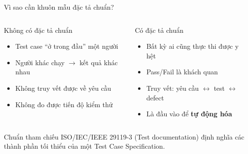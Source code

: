 \documentclass[aspectratio=169,12pt]{beamer}
\begin{document}
\begin{frame}{Vì sao cần khuôn mẫu đặc tả chuẩn?}
  \begin{columns}[T]
    \begin{block}{Không có đặc tả chuẩn}
      \begin{itemize}
        \item Test case ``ở trong đầu'' một người
        \item Người khác chạy $\to$ kết quả khác nhau
        \item Không truy vết được về yêu cầu
        \item Không đo được tiến độ kiểm thử
      \end{itemize}
    \end{block}

    \begin{block}{Có đặc tả chuẩn}
      \begin{itemize}
        \item Bất kỳ ai cũng thực thi được y hệt
        \item Pass/Fail là khách quan
        \item Truy vết: yêu cầu $\leftrightarrow$ test $\leftrightarrow$ defect
        \item Là đầu vào để \textbf{tự động hóa}
      \end{itemize}
    \end{block}
  \end{columns}

  \vspace{0.3em}
  \begin{exampleblock}{Chuẩn tham chiếu}
    ISO/IEC/IEEE 29119-3 (Test documentation) định nghĩa các thành phần
    tối thiểu của một Test Case Specification.
  \end{exampleblock}
\end{frame}
\end{document}
